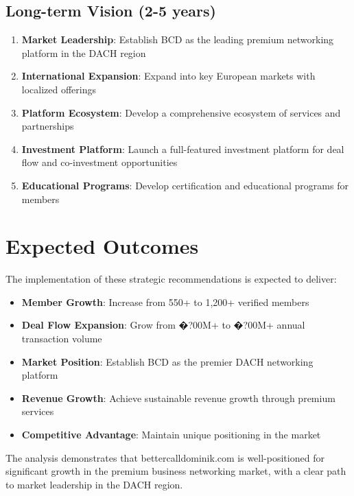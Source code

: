\subsection{Long-term Vision (2-5 years)}
\begin{enumerate}
    \item \textbf{Market Leadership}: Establish BCD as the leading premium networking platform in the DACH region
    \item \textbf{International Expansion}: Expand into key European markets with localized offerings
    \item \textbf{Platform Ecosystem}: Develop a comprehensive ecosystem of services and partnerships
    \item \textbf{Investment Platform}: Launch a full-featured investment platform for deal flow and co-investment opportunities
    \item \textbf{Educational Programs}: Develop certification and educational programs for members
\end{enumerate}

\section{Expected Outcomes}

The implementation of these strategic recommendations is expected to deliver:

\begin{itemize}
    \item \textbf{Member Growth}: Increase from 550+ to 1,200+ verified members
    \item \textbf{Deal Flow Expansion}: Grow from �?00M+ to �?00M+ annual transaction volume
    \item \textbf{Market Position}: Establish BCD as the premier DACH networking platform
    \item \textbf{Revenue Growth}: Achieve sustainable revenue growth through premium services
    \item \textbf{Competitive Advantage}: Maintain unique positioning in the market
\end{itemize}

The analysis demonstrates that bettercalldominik.com is well-positioned for significant growth in the premium business networking market, with a clear path to market leadership in the DACH region. 
